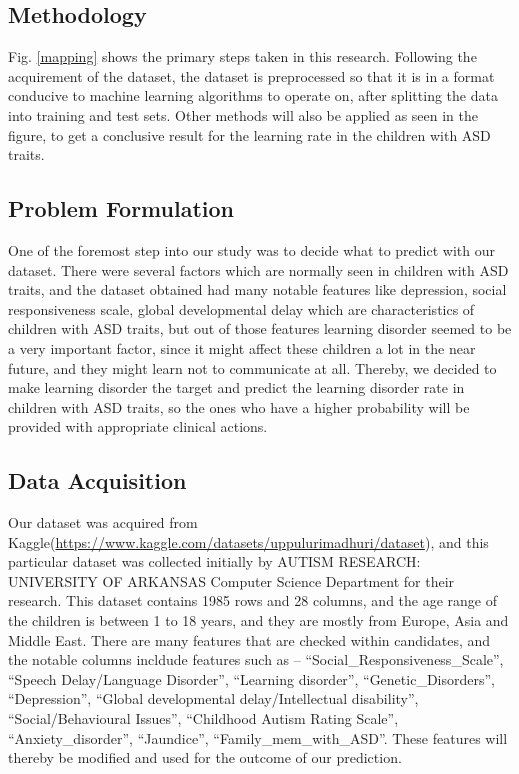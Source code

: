 \documentclass{article}
\begin{document}
\begin{multicols}{2}
\section{Methodology}
\hspace*{\parindent}Fig. \ref{mapping} shows the primary steps taken in this research. Following the acquirement of the dataset, the dataset is preprocessed so that it is in a format conducive to machine learning algorithms to operate on, after splitting the data into training and test sets. Other methods will also be applied as seen in the figure, to get a conclusive result for the learning rate in the children with ASD traits.

\subsection{Problem Formulation}
\hspace*{\parindent}One of the foremost step into our study was to decide what to predict with our dataset. There were several factors which are normally seen in children with ASD traits, and the dataset obtained had many notable features like depression, social responsiveness scale, global developmental delay which are characteristics of children with ASD traits, but out of those features learning disorder seemed to be a very important factor, since it might affect these children a lot in the near future, and they might learn not to communicate at all. Thereby, we decided to make learning disorder the target and predict the learning disorder rate in children with ASD traits, so the ones who have a higher probability will be provided with appropriate clinical actions.

\subsection{Data Acquisition}
\hspace*{\parindent}Our dataset was acquired from Kaggle(\url{https://www.kaggle.com/datasets/uppulurimadhuri/dataset}), and this particular dataset was collected initially by AUTISM RESEARCH: UNIVERSITY OF ARKANSAS Computer Science Department for their research. This dataset contains 1985 rows and 28 columns, and the age range of the children is between 1 to 18 years, and they are mostly from Europe, Asia and Middle East. There are many features that are checked within candidates, and the notable columns incldude features such as -- 
``Social\_Responsiveness\_Scale'', ``Speech Delay/Language Disorder'', ``Learning disorder'', ``Genetic\_Disorders'', ``Depression'', ``Global developmental delay/Intellectual disability'', ``Social/Behavioural Issues'', ``Childhood Autism Rating Scale'', ``Anxiety\_disorder'', ``Jaundice'', ``Family\_mem\_with\_ASD''. These features will thereby be modified and used for the outcome of our prediction.


\end{multicols}
\end{document}
